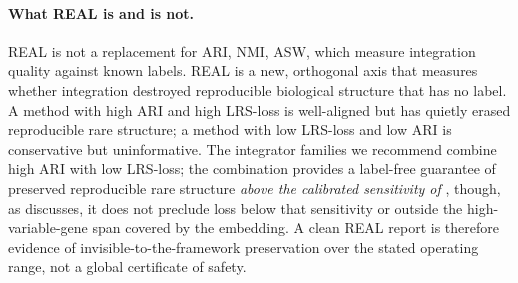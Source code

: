 
\paragraph{What REAL is and is not.} REAL is not a replacement for ARI, NMI, ASW, which measure integration quality against known labels.  REAL is a new, orthogonal axis that measures whether integration destroyed reproducible biological structure that has no label.  A method with high ARI and high LRS-loss is well-aligned but has quietly erased reproducible rare structure; a method with low LRS-loss and low ARI is conservative but uninformative.  The integrator families we recommend combine high ARI with low LRS-loss; the combination provides a label-free guarantee of preserved reproducible rare structure \emph{above the calibrated sensitivity of} , though, as  discusses, it does not preclude loss below that sensitivity or outside the high-variable-gene span covered by the embedding. A clean REAL report is therefore evidence of invisible-to-the-framework preservation over the stated operating range, not a global certificate of safety.
